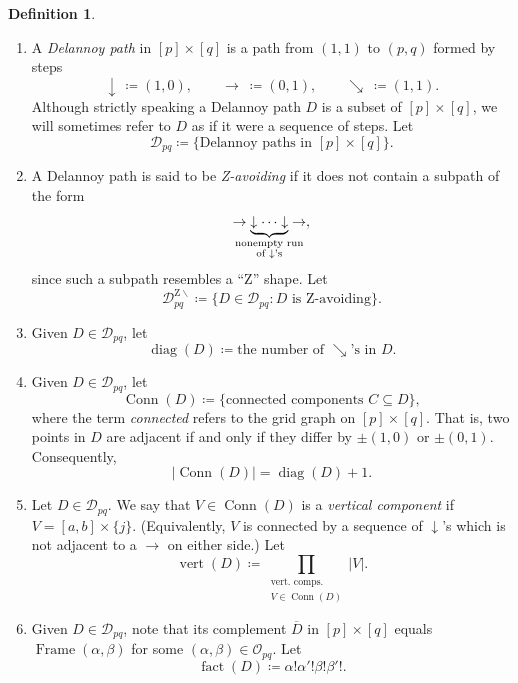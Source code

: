 \documentclass[noamsfonts,10pt]{amsart}
\newcommand{\D}{\mathcal{D}}
\newcommand{\DZ}{\mathcal{D}^{\mathrm{Z} \!\!\!\! \backslash}}
\newcommand{\al}{\alpha}
\newcommand{\be}{\beta}
\DeclareMathOperator{\Fr}{Frame}
\renewcommand{\O}{\mathcal{O}}
\newcommand{\dd}{\operatorname{diag}}
\newcommand{\vv}{\operatorname{vert}}
\newcommand{\ff}{\operatorname{fact}}
\DeclareMathOperator{\Conn}{Conn}
\newcommand{\1}{\mathbf{1}}
\theoremstyle{plain}
\theoremstyle{definition}
\newtheorem{dfn}[theorem]{Definition}
\numberwithin{equation}{section}
\begin{document}
\begin{dfn}\
    \label{def:Delannoy}

    \begin{enumerate}

    \item A \emph{Delannoy  path} in $[p] \times [q]$ is a path from $(1,1)$ to $(p,q)$ formed by steps 
    \[
    \downarrow \, \coloneqq (1,0), \qquad \rightarrow \: \coloneqq (0,1), \qquad \searrow \: \coloneqq (1,1).
    \]
    Although strictly speaking a Delannoy path $D$ is a subset of $[p] \times [q]$, we will sometimes refer to $D$ as if it were a sequence of steps. 
    Let
    \[
        \D_{pq} \coloneqq \Big\{ \text{Delannoy paths in $[p] \times [q]$} \Big\}.
    \]
    
    \item \label{DZ definition} A Delannoy path is said to be \emph{Z-avoiding} if it does not contain a subpath of the form
    \[
        \rightarrow \underbrace{\downarrow \cdots \downarrow}_{\mathclap{\substack{\text{nonempty run} \\ \text{of $\downarrow$'s}}}} \rightarrow,
    \]
    since such a subpath resembles a ``Z'' shape.
    Let
    \[
    \DZ_{pq} \coloneqq 
    \Big\{ D \in \D_{pq} : 
    \text{$D$ is Z-avoiding}
    \Big\}.
    \]
    
    \item \label{dd(D)} 
    Given $D \in \D_{pq}$, let
    \[
        \dd(D) \coloneqq \text{the number of $\searrow$'s in $D$}.
    \]
    
    \item \label{Conn(D)} Given $D \in \D_{pq}$, let
    \[
        \Conn(D) \coloneqq \Big\{ \text{connected components $C \subseteq D$} \Big\},
    \]
    where the term \emph{connected} refers to the grid graph on $[p] \times [q]$.
    That is, two points in $D$ are adjacent if and only if they differ by $\pm( 1,0)$ or $\pm(0, 1)$.
    Consequently,
    \[
        \left| \Conn(D) \right| = \dd(D) + 1.
    \]

    \item \label{vv(D)} Let $D \in \D_{pq}$.
    We say that $V \in \Conn(D)$ is a \emph{vertical component} if $V = [a,b] \times \{j\}$.
    (Equivalently, $V$ is connected by a sequence of $\downarrow$'s which is not adjacent to a $\rightarrow$ on either side.)
    Let
    \[
        \vv(D) \coloneqq \prod_{\substack{\text{vert.~comps.} \\ V \in \Conn(D)} } |V|.
    \]

    \item \label{ff(D)} Given $D \in \D_{pq}$, note that its complement $\overline{D}$ in $[p] \times [q]$  equals $\Fr(\al,\be)$ for some $(\al,\be) \in \O_{pq}$.
    Let
    \[
        \ff(D) \coloneqq \al! \al'! \be! \be'!.
    \]
    \end{enumerate}
\end{dfn}
\end{document}

